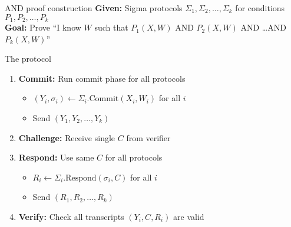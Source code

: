 \documentclass[aspectratio=169, lualatex, handout]{beamer}
\begin{document}
\begin{frame}{AND proof construction}
	\textbf{Given:} Sigma protocols $\Sigma_1, \Sigma_2, \ldots, \Sigma_k$ for conditions $P_1, P_2, \ldots, P_k$\\
	\textbf{Goal:} Prove ``I know $W$ such that $P_1(X,W)$ AND $P_2(X,W)$ AND \ldots AND $P_k(X,W)$''
	\vspace{0.5em}
	\begin{block}{The protocol}
		\begin{enumerate}
			\item \textbf{Commit:} Run commit phase for all protocols
			      \begin{itemize}
				      \item $(Y_i, \sigma_i) \leftarrow \Sigma_i.\text{Commit}(X_i, W_i)$ for all $i$
				      \item Send $(Y_1, Y_2, \ldots, Y_k)$
			      \end{itemize}
			\item \textbf{Challenge:} Receive single $C$ from verifier
			\item \textbf{Respond:} Use same $C$ for all protocols
			      \begin{itemize}
				      \item $R_i \leftarrow \Sigma_i.\text{Respond}(\sigma_i, C)$ for all $i$
				      \item Send $(R_1, R_2, \ldots, R_k)$
			      \end{itemize}
			\item \textbf{Verify:} Check all transcripts $(Y_i, C, R_i)$ are valid
		\end{enumerate}
	\end{block}
\end{frame}
\end{document}
